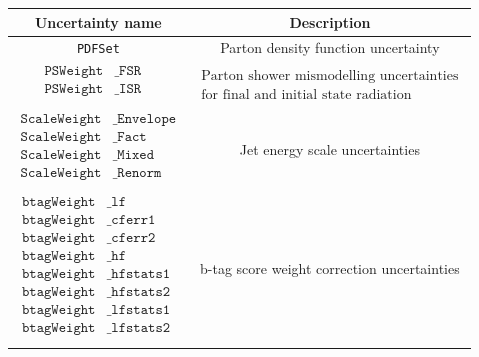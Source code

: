 \begin{table}[h!]
	\centering
	\begin{tabular}{cc}
		Uncertainty name               & Description \\
		
		\hline
		\texttt{PDFSet} & Parton density function uncertainty \\
		
		\hline
		$\begin{aligned}
			\texttt{PSWeight}&\texttt{\_FSR} & \\
			\texttt{PSWeight}&\texttt{\_ISR} & \\
		\end{aligned}$ & $\begin{array}{c}
			\text{Parton shower mismodelling uncertainties} \\
			\text{for final and initial state radiation}
		\end{array}$ \\
		
		\hline
		$\begin{aligned}	
			\texttt{ScaleWeight}&\texttt{\_Envelope} \\
			\texttt{ScaleWeight}&\texttt{\_Fact    } \\
			\texttt{ScaleWeight}&\texttt{\_Mixed   } \\
			\texttt{ScaleWeight}&\texttt{\_Renorm  } \\
		\end{aligned}$ & Jet energy scale uncertainties \\
		
		\hline
		$\begin{aligned}
			\texttt{btagWeight}&\texttt{\_lf       } \\
			\texttt{btagWeight}&\texttt{\_cferr1   } \\
			\texttt{btagWeight}&\texttt{\_cferr2   } \\
			\texttt{btagWeight}&\texttt{\_hf       } \\
			\texttt{btagWeight}&\texttt{\_hfstats1 } \\
			\texttt{btagWeight}&\texttt{\_hfstats2 } \\
			\texttt{btagWeight}&\texttt{\_lfstats1 } \\
			\texttt{btagWeight}&\texttt{\_lfstats2 } \\
		\end{aligned}$ & b-tag score weight correction uncertainties \\
		

\end{tabular}
\end{table}
